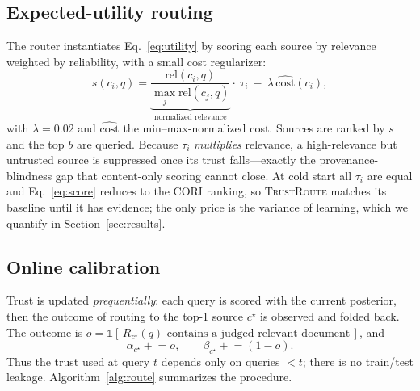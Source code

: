 \documentclass[preprint,12pt]{elsarticle}
\newcommand{\system}{\textsc{TrustRoute}}
\newcommand{\rel}{\mathrm{rel}}
\newcommand{\cost}{\mathrm{cost}}
\begin{document}
\subsection{Expected-utility routing}
The router instantiates Eq.~\eqref{eq:utility} by scoring each source by relevance
weighted by reliability, with a small cost regularizer:
\begin{equation}
s(c_i,q)=\underbrace{\frac{\rel(c_i,q)}{\max_j \rel(c_j,q)}}_{\text{normalized relevance}}\cdot\ \tau_i\ -\ \lambda\,\widehat{\cost}(c_i),
\label{eq:score}
\end{equation}
with $\lambda=0.02$ and $\widehat{\cost}$ the min--max-normalized cost. Sources
are ranked by $s$ and the top $b$ are queried. Because $\tau_i$ \emph{multiplies}
relevance, a high-relevance but untrusted source is suppressed once its trust
falls---exactly the provenance-blindness gap that content-only scoring cannot
close. At cold start all $\tau_i$ are equal and Eq.~\eqref{eq:score} reduces to
the CORI ranking, so \system{} matches its baseline until it has evidence; the
only price is the variance of learning, which we quantify in
Section~\ref{sec:results}.

\subsection{Online calibration}
Trust is updated \emph{prequentially}: each query is scored with the current
posterior, then the outcome of routing to the top-1 source $c^\star$ is observed
and folded back. The outcome is $o=\mathbb{1}[\,R_{c^\star}(q)\text{ contains a
judged-relevant document}\,]$, and
\begin{equation}
\alpha_{c^\star}\!\mathrel{+}=o,\qquad \beta_{c^\star}\!\mathrel{+}=(1-o).
\end{equation}
Thus the trust used at query $t$ depends only on queries $<t$; there is no
train/test leakage. Algorithm~\ref{alg:route} summarizes the procedure.
\end{document}
